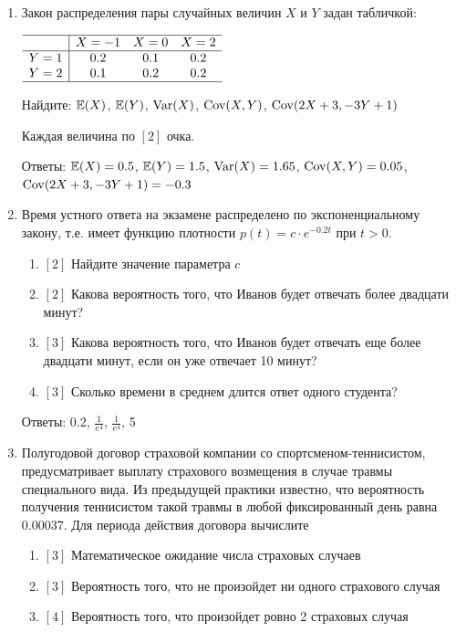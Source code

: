 \documentclass[12pt, a4paper]{article}\usepackage[]{graphicx}\usepackage[]{color}
\begin{document}
\begin{enumerate}
\item Закон распределения пары случайных величин $X$ и $Y$ задан табличкой:

$\begin{array}{c|ccc}
\hline
 & X=-1 & X=0 & X=2 \\
\hline
Y=1 & 0.2 & 0.1 & 0.2 \\
Y=2 & 0.1 & 0.2 & 0.2 \\
\hline
\end{array}$

Найдите: $\mathbb{E}(X)$, $\mathbb{E}(Y)$, $\operatorname{Var}(X)$, $\operatorname{Cov}(X,Y)$, $\operatorname{Cov}(2X+3,-3Y+1)$

Каждая величина по $[2]$ очка.

Ответы: $\mathbb{E}(X)=0.5$, $\mathbb{E}(Y)=1.5$, $\operatorname{Var}(X)=1.65$, $\operatorname{Cov}(X,Y)=0.05$, $\operatorname{Cov}(2X+3,-3Y+1)=-0.3$

\item Время устного ответа на экзамене распределено по экспоненциальному закону, т.е. имеет функцию плотности $p(t)=c\cdot e^{-0.2t}$ при $t>0$.
\begin{enumerate}
\item{} $[2]$ Найдите значение параметра $c$
\item{} $[2]$ Какова вероятность того, что Иванов будет отвечать более двадцати минут?
\item{} $[3]$ Какова вероятность того, что Иванов будет отвечать еще более двадцати минут, если он уже отвечает 10 минут?
\item{} $[3]$ Сколько времени в среднем длится ответ одного студента?
\end{enumerate}

Ответы: 0.2, $\frac{1}{e^4}$, $\frac{1}{e^4}$, 5

\item Полугодовой договор страховой компании со спортсменом-теннисистом, предусматривает выплату страхового возмещения  в случае травмы специального вида. Из предыдущей практики известно, что вероятность получения теннисистом такой травмы  в любой фиксированный день равна 0.00037. Для периода действия договора вычислите
\begin{enumerate}
\item{} $[3]$ Математическое ожидание числа страховых случаев
\item{} $[3]$ Вероятность того, что не произойдет ни одного страхового случая
\item{} $[4]$ Вероятность того, что произойдет ровно 2 страховых случая
\end{enumerate}


\end{enumerate}
\end{document}
